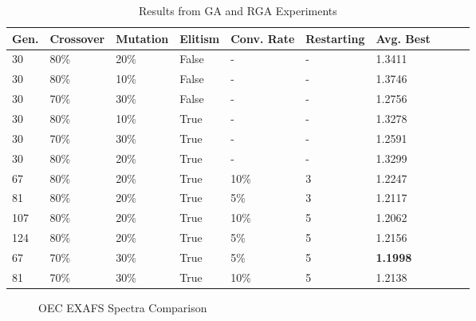 \documentclass[conference]{IEEEtran}
\begin{document}
\begin{table}
  \caption{Results from GA and RGA Experiments}
  \label{table:sampleRuns}
  \centering
  \begin{tabular}{ | l | l | l | l | l | l | l | l | l | l | }
    \hline
    Gen. & Crossover & Mutation & Elitism & Conv. Rate & Restarting &  Avg. Best \\ \hline \hline
    30 & 80\% & 20\% & False & - & - & 1.3411 \\ \hline
    30 & 80\% & 10\% & False & - & - & 1.3746 \\ \hline
    30 & 70\% & 30\% & False & - & - & 1.2756 \\ \hline
    30 & 80\% & 10\% & True & - & - & 1.3278 \\ \hline
    30 & 70\% & 30\% & True & - & - & 1.2591 \\ \hline
    30 & 80\% & 20\% & True & - & - & 1.3299 \\ \hline
    67 & 80\% & 20\% & True & 10\% & 3 & 1.2247 \\ \hline
    81 & 80\% & 20\% & True & 5\% & 3 & 1.2117 \\ \hline
    107 & 80\% & 20\% & True & 10\% & 5 & 1.2062 \\ \hline
    124 & 80\% & 20\% & True & 5\% & 5 & 1.2156 \\ \hline
    67 & 70\% & 30\% & True & 5\% & 5 & \textbf{1.1998} \\ \hline
    81 & 70\% & 30\% & True & 10\% & 5 & 1.2138 \\ \hline
  \end{tabular}
\end{table}

\begin{figure}
\caption{OEC EXAFS Spectra Comparison}
\label{fig:bestRunEXAFS}
\begin{center}
\end{center}
\end{figure}
\end{document}
